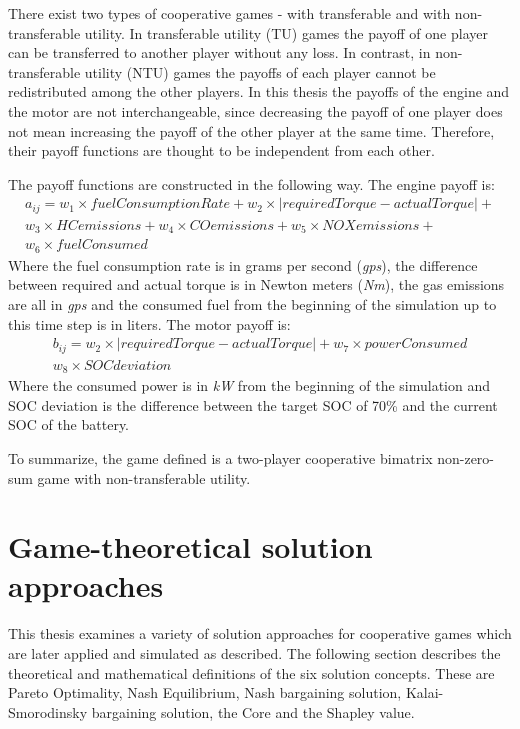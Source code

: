 There exist two types of cooperative games - with transferable and with non-transferable utility. In transferable utility (TU) games the payoff of one player can be transferred to another player without any loss. In contrast, in non-transferable utility (NTU) games the payoffs of each player cannot be redistributed among the other players. In this thesis the payoffs of the engine and the motor are not interchangeable, since decreasing the payoff of one player does not mean increasing the payoff of the other player at the same time. Therefore, their payoff functions are thought to be independent from each other.

The payoff functions are constructed in the following way. The engine payoff is:
\begin{equation}
\begin{split}
a_{ij} = w_1 \times fuelConsumptionRate + w_2 \times | requiredTorque - actualTorque | + \\
w_3 \times HCemissions + w_4 \times COemissions + w_5 \times NOXemissions + \\
w_6 \times fuelConsumed
\end{split}
\end{equation}
Where the fuel consumption rate is in grams per second (\textit{gps}), the difference between required and actual torque is in Newton meters (\textit{Nm}), the gas emissions are all in \textit{gps} and the consumed fuel from the beginning of the simulation up to this time step is in liters. The motor payoff is:
\begin{equation}
\begin{split}
b_{ij} = w_2 \times | requiredTorque - actualTorque | + w_7 \times powerConsumed\\
w_8 \times SOCdeviation
\end{split}
\end{equation}
Where the consumed power is in \textit{kW} from the beginning of the simulation and SOC deviation is the difference between the target SOC of 70\% and the current SOC of the battery.

To summarize, the game defined is a two-player cooperative bimatrix non-zero-sum game with non-transferable utility.

\section{Game-theoretical solution approaches}
This thesis examines a variety of solution approaches for cooperative games which are later applied and simulated as described. The following section describes the theoretical and mathematical definitions of the six solution concepts. These are Pareto Optimality, Nash Equilibrium, Nash bargaining solution, Kalai-Smorodinsky bargaining solution, the Core and the Shapley value.


